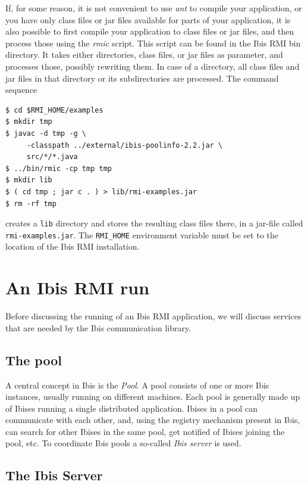 \documentclass[a4paper,10pt]{article}
\begin{document}
If, for some reason, it is not convenient to use \emph{ant} to compile
your application, or you have only class files or jar files available
for parts of your application, it is also possible to first compile
your application to class files or jar files, and then process those
using the \emph{rmic} script. This script can be found in the Ibis RMI
bin directory. It takes either directories, class files, or jar files
as parameter, and processes those, possibly rewriting them. In case
of a directory, all class files and jar files in that directory or
its subdirectories are processed.  The command sequence

\begin{verbatim}
$ cd $RMI_HOME/examples
$ mkdir tmp
$ javac -d tmp -g \
     -classpath ../external/ibis-poolinfo-2.2.jar \
     src/*/*.java
$ ../bin/rmic -cp tmp tmp
$ mkdir lib
$ ( cd tmp ; jar c . ) > lib/rmi-examples.jar
$ rm -rf tmp
\end{verbatim}

creates a \texttt{lib} directory and stores the resulting class files there,
in a jar-file called \texttt{rmi-examples.jar}.
The \texttt{RMI\_HOME} environment variable must be set to the location of
the Ibis RMI installation.

\section{An Ibis RMI run}

Before discussing
the running of an Ibis RMI application, we will discuss services that are
needed by the Ibis communication library.

\subsection{The pool}

A central concept in Ibis is the \emph{Pool}. A pool consists of one or
more Ibis instances, usually running on different machines. Each pool is
generally made up of Ibises running a single distributed application.
Ibises in a pool can communicate with each other, and, using the
registry mechanism present in Ibis, can search for other Ibises in the
same pool, get notified of Ibises joining the pool, etc. To
coordinate Ibis pools a so-called \emph{Ibis server} is used.

\subsection{The Ibis Server}
\end{document}
